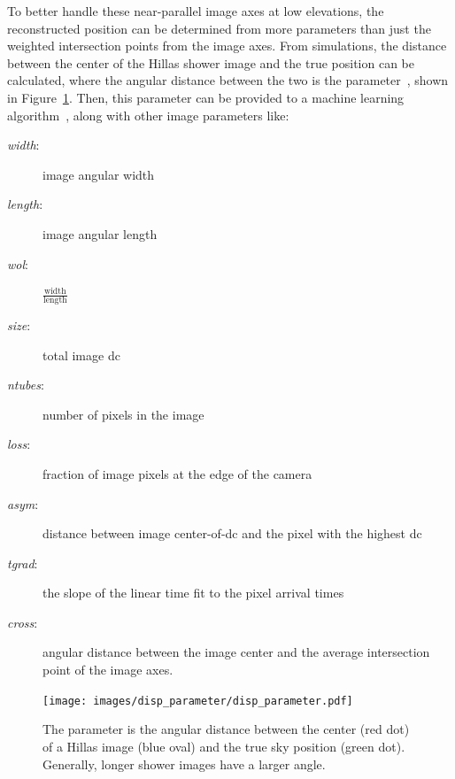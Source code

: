     To better handle these near-parallel image axes at low elevations, the reconstructed position can be determined from more parameters than just the weighted intersection points from the image axes.
    From simulations, the distance between the center of the Hillas shower image and the true position can be calculated, where the angular distance between the two is the \disp{} parameter~\cite{Senturk:2011}, shown in Figure~\ref{fig:dispdiagram}.
    Then, this \disp{} parameter can be provided to a machine learning algorithm~\cite{Beilicke2012NIM}, along with other image parameters like:
    \begin{description}
      \item[\textit{width}:] image angular width
      \item[\textit{length}:] image angular length
      \item[\textit{wol}:] $\frac{\textrm{width}}{\textrm{length}}$
      \item[\textit{size}:] total image dc
      \item[\textit{ntubes}:] number of pixels in the image
      \item[\textit{loss}:] fraction of image pixels at the edge of the camera
      \item[\textit{asym}:] distance between image center-of-dc and the pixel with the highest dc
      \item[\textit{tgrad}:] the slope of the linear time fit to the pixel arrival times
      \item[\textit{cross}:] angular distance between the image center and the average intersection point of the image axes.
    \end{description}


    \begin{figure}[ht]
      \centering
      \texttt{[image: images/disp\_parameter/disp\_parameter.pdf]}
      \caption[Angular Reconstruction Disp]{
        The \disp{} parameter is the angular distance between the center (red dot) of a Hillas image (blue oval) and the true sky position (green dot).
        Generally, longer shower images have a larger \disp{} angle.
      }
      \label{fig:dispdiagram}
    \end{figure}

